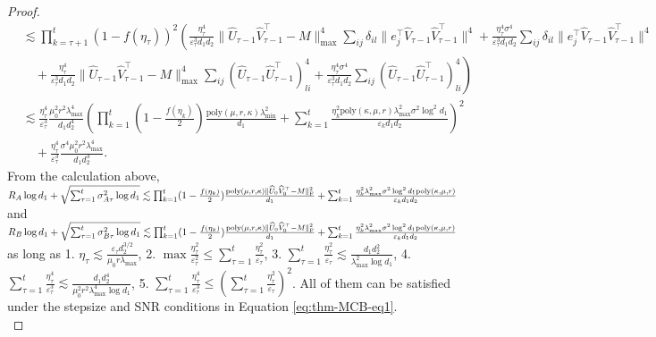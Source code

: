 \documentclass[12pt]{article}
\newcommand\fro[1]{\| #1 \|_{\rm{F}}}
\theoremstyle{plain}
\begin{document}
\begin{proof}
\begin{align*}
    &\lesssim \prod_{k=\tau+1}^{t}(1-f(\eta_{\tau}))^2 \left(\frac{\eta_{\tau}^4}{\varepsilon_{\tau}^3 d_1d_2}\|\widehat{U}_{\tau-1}\widehat{V}_{\tau-1}^{\top} - M\|_{\max}^4\sum_{ij}\delta_{il}\|e_j^{\top}\widehat{V}_{\tau-1}\widehat{V}_{\tau-1}^{\top}\|^4 + \frac{\eta_{\tau}^4\sigma^4}{\varepsilon_{\tau}^3 d_1d_2}\sum_{ij} \delta_{il}\|e_j^{\top}\widehat{V}_{\tau-1}\widehat{V}_{\tau-1}^{\top}\|^4 \right.\\ &\left.\quad + \frac{\eta_{\tau}^4}{\varepsilon_{\tau}^3 d_1d_2}\|\widehat{U}_{\tau-1}\widehat{V}_{\tau-1}^{\top} - M\|_{\max}^4\sum_{ij} (\widehat{U}_{\tau-1}\widehat{U}_{\tau-1}^{\top})_{li}^4 + \frac{\eta_{\tau}^4\sigma^4}{\varepsilon_{\tau}^3 d_1d_2}\sum_{ij} (\widehat{U}_{\tau-1}\widehat{U}_{\tau-1}^{\top})_{li}^4\right) \\
    &\lesssim \frac{\eta_{\tau}^4}{\varepsilon_{\tau}^3}\frac{\mu_0^2r^2\lambda_{\max}^4}{d_1 d_2^4}\left(\prod_{k=1}^{t}(1-\frac{f(\eta_k)}{2}) \frac{\text{poly}(\mu,r,\kappa)\lambda_{\min}^2}{d_1}  +  \sum_{k=1}^{t} \frac{\eta_k^2\text{poly}(\kappa,\mu,r)\lambda_{\max}^2\sigma^2\log^2d_1}{\varepsilon_k d_1d_2}\right)^2 \\ &\quad + \frac{\eta_{\tau}^4}{\varepsilon_{\tau}^3}\frac{\sigma^4\mu_0^2r^2\lambda_{\max}^4}{d_1d_2^3}.
\end{align*}
From the calculation above, $R_A\log d_1+\sqrt{\sum_{\tau=1}^{t}\sigma_{A\tau}^2\log d_1}\lesssim \prod_{k=1}^{t}(1-\frac{f(\eta_k)}{2}) \frac{\text{poly}(\mu,r,\kappa)\fro{\widehat{U}_0\widehat{V}_0^{\top}-M}^2}{d_1}  +  \sum_{k=1}^{t} \frac{\eta_k^2\lambda_{\max}^2\sigma^2\log^2d_1\text{poly}(\kappa,\mu,r)}{\varepsilon_k d_1d_2}$ and  $R_B\log d_1+\sqrt{\sum_{\tau=1}^{t}\sigma_{B\tau}^2\log d_1}\lesssim \prod_{k=1}^{t}(1-\frac{f(\eta_k)}{2}) \frac{\text{poly}(\mu,r,\kappa)\fro{\widehat{U}_0\widehat{V}_0^{\top}-M}^2}{d_1}  +  \sum_{k=1}^{t} \frac{\eta_k^2\lambda_{\max}^2\sigma^2\log^2d_1\text{poly}(\kappa,\mu,r)}{\varepsilon_k d_1d_2}$ as long as 1. $\eta_{\tau}\lesssim \frac{\varepsilon_{\tau}d_2^{3/2}}{\mu_0r\lambda_{\max}}$, 2. $\max \frac{\eta_{\tau}^2}{\varepsilon_{\tau}^2}\leq \sum_{\tau=1}^{t}\frac{\eta_{\tau}^2}{\varepsilon_{\tau}}$, 3. $\sum_{\tau=1}^{t} \frac{\eta_{\tau}^2}{\varepsilon_{\tau}}\lesssim \frac{d_1d_2^2}{\lambda_{\max}^2\log d_1}$, 4. $\sum_{\tau=1}^{t} \frac{\eta_{\tau}^4}{\varepsilon_{\tau}^3}\lesssim \frac{d_1d_2^4}{\mu_0^2r^2\lambda_{\max}^4\log d_1}$, 5. $\sum_{\tau=1}^{t} \frac{\eta_{\tau}^4}{\varepsilon_{\tau}^3}\leq (\sum_{\tau=1}^{t} \frac{\eta_{\tau}^2}{\varepsilon_{\tau}})^2$. All of them can be satisfied under the stepsize and SNR conditions in Equation \ref{eq:thm-MCB-eq1}. \\

\end{proof}
\end{document}
